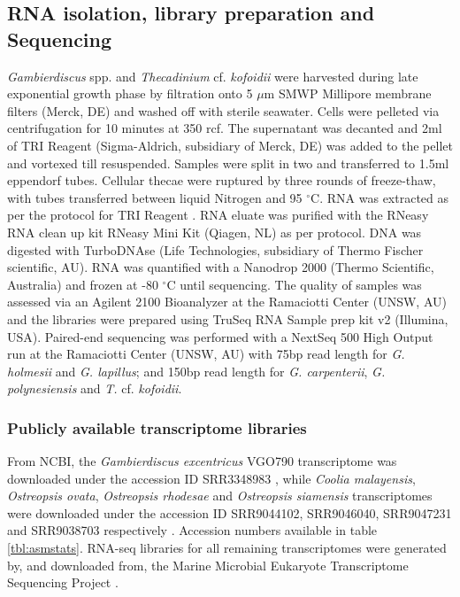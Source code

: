 \documentclass[fleqn,10pt,lineno]{wlpeerj} %
\begin{document}
\subsection*{RNA isolation, library preparation and Sequencing}
\emph{Gambierdiscus} spp. and \emph{Thecadinium} cf. \emph{kofoidii} were harvested during late exponential growth phase by filtration onto 5 $\mu$m SMWP Millipore membrane filters (Merck, DE) and washed off with sterile seawater. 
Cells were pelleted via centrifugation for 10 minutes at 350 rcf. 
The supernatant was decanted and 2ml of TRI Reagent (Sigma-Aldrich, subsidiary of Merck, DE) was added to the pellet and vortexed till resuspended. 
Samples were split in two and transferred to 1.5ml eppendorf tubes. 
Cellular thecae were ruptured by three rounds of freeze-thaw, with tubes transferred between liquid Nitrogen and 95 $^{\circ}$C. 
RNA was extracted as per the protocol for TRI Reagent \citep{rio2010purification}.
RNA eluate was purified with the RNeasy RNA clean up kit RNeasy Mini Kit (Qiagen, NL) as per protocol. 
DNA was digested with TurboDNAse (Life Technologies, subsidiary of Thermo Fischer scientific, AU). 
RNA was quantified with a Nanodrop 2000 (Thermo Scientific, Australia) and frozen at -80 $^{\circ}$C until sequencing.
The quality of samples was assessed via an Agilent 2100 Bioanalyzer at the Ramaciotti Center (UNSW, AU) and the libraries were prepared using TruSeq RNA Sample prep kit v2 (Illumina, USA). 
Paired-end sequencing was performed with a NextSeq 500 High Output run at the Ramaciotti Center (UNSW, AU) with 75bp read length for \emph{G. holmesii} and \emph{G. lapillus}; and 150bp read length for \emph{G. carpenterii}, \emph{G. polynesiensis} and \emph{T.} cf. \emph{kofoidii}.

\subsubsection*{Publicly available transcriptome libraries}
From NCBI, the \emph{Gambierdiscus excentricus} VGO790 transcriptome was downloaded under the accession ID SRR3348983 \citep{kohli2017role}, while \textit{Coolia malayensis}, \textit{Ostreopsis ovata}, \textit{Ostreopsis rhodesae} and \textit{Ostreopsis siamensis} transcriptomes were downloaded under the accession ID SRR9044102, SRR9046040, SRR9047231 and SRR9038703 respectively \citep{verma2018comparative}. 
Accession numbers available in table \ref{tbl:asmstats}. 
RNA-seq libraries for all remaining transcriptomes were generated by, and downloaded from, the Marine Microbial Eukaryote Transcriptome Sequencing Project \citep{keeling2014marine}.
\end{document}

